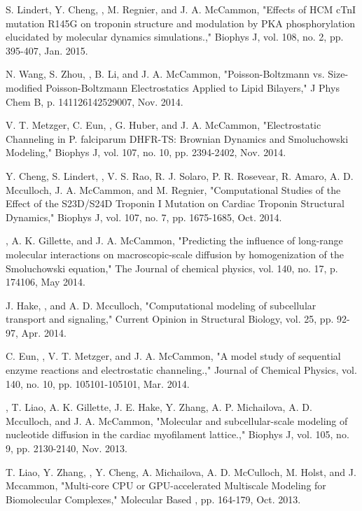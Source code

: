 \begin{etaremune}
\setcounter{enumi}{11} %
\item S. Lindert, Y. Cheng, \pmkh, M. Regnier, and J. A. McCammon, "Effects of HCM cTnI mutation R145G on troponin structure and modulation by PKA phosphorylation elucidated by molecular dynamics simulations.," Biophys J, vol. 108, no. 2, pp. 395-407, Jan. 2015. 
\item N. Wang, S. Zhou, \pmkh, B. Li, and J. A. McCammon, "Poisson-Boltzmann vs. Size-modified Poisson-Boltzmann Electrostatics Applied to Lipid Bilayers," J Phys Chem B, p. 141126142529007, Nov. 2014. 
\item V. T. Metzger, C. Eun, \pmkh, G. Huber, and J. A. McCammon, "Electrostatic Channeling in P. falciparum DHFR-TS: Brownian Dynamics and Smoluchowski Modeling," Biophys J, vol. 107, no. 10, pp. 2394-2402, Nov. 2014. 
\item Y. Cheng, S. Lindert, \pmkh, V. S. Rao, R. J. Solaro, P. R. Rosevear, R. Amaro, A. D. Mcculloch, J. A. McCammon, and M. Regnier, "Computational Studies of the Effect of the S23D/S24D Troponin I Mutation on Cardiac Troponin Structural Dynamics," Biophys J, vol. 107, no. 7, pp. 1675-1685, Oct. 2014.
\item \pmkh, A. K. Gillette, and J. A. McCammon, "Predicting the influence of long-range molecular interactions on macroscopic-scale diffusion by homogenization of the Smoluchowski equation," The Journal of chemical physics, vol. 140, no. 17, p. 174106, May 2014.
\item J. Hake, \pmkh, and A. D. Mcculloch, "Computational modeling of subcellular transport and signaling," Current Opinion in Structural Biology, vol. 25, pp. 92-97, Apr. 2014.
\item C. Eun, \pmkh*, V. T. Metzger, and J. A. McCammon, "A model study of sequential enzyme reactions and electrostatic channeling.," Journal of Chemical Physics, vol. 140, no. 10, pp. 105101-105101, Mar. 2014.
\item \pmkh, T. Liao, A. K. Gillette, J. E. Hake, Y. Zhang, A. P. Michailova, A. D. Mcculloch, and J. A. McCammon, "Molecular and subcellular-scale modeling of nucleotide diffusion in the cardiac myofilament lattice.," Biophys J, vol. 105, no. 9, pp. 2130-2140, Nov. 2013.
\item T. Liao, Y. Zhang, \pmkh, Y. Cheng, A. Michailova, A. D. McCulloch, M. Holst, and J. Mccammon, "Multi-core CPU or GPU-accelerated Multiscale Modeling for Biomolecular Complexes," Molecular Based , pp. 164-179, Oct. 2013.

\end{etaremune}
